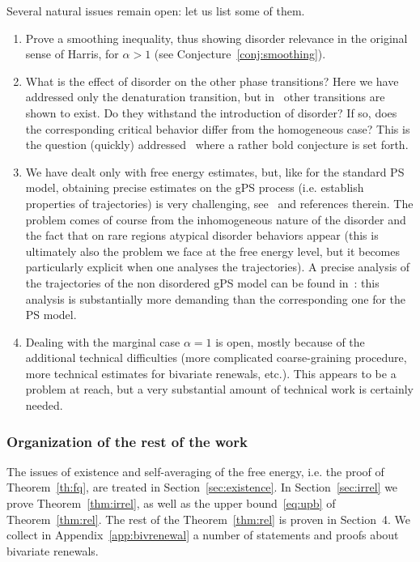 \documentclass[11pt]{article}
\theoremstyle{definition}
\numberwithin{equation}{section}
\numberwithin{figure}{section}
\numberwithin{table}{section}
\newcommand{\ga}{\alpha}
\begin{document}
Several natural issues remain open: let us list some of them.
\begin{enumerate}
\item Prove a smoothing inequality, thus showing disorder relevance in the original sense of Harris, for $\ga>1$ (see Conjecture~\ref{conj:smoothing}).
\item What is the effect of disorder on the other phase transitions? Here we have addressed only the denaturation transition, but in~\cite{cf:GK} other transitions are shown to exist. Do they withstand the introduction of disorder? If so, does the corresponding critical behavior differ from the homogeneous case? This is the question (quickly) addressed~\cite{cf:NG06} where a rather bold conjecture is set forth.
\item We have dealt only with free energy estimates, but, like for the standard PS model, obtaining precise estimates on the gPS process (i.e. establish properties of trajectories) is very challenging, see~\cite[Chapter~8]{cf:G} and references therein. The problem comes of course from the inhomogeneous nature of the disorder and the fact that on rare regions atypical disorder behaviors appear (this is ultimately also the problem we face at the free energy level, but it becomes particularly explicit when one analyses the trajectories). A precise analysis of the trajectories of the non disordered gPS model can be found in~\cite{cf:BGK}: this analysis is substantially more demanding than the corresponding one for the PS model.
\item Dealing with the marginal case $\ga=1$ is open, mostly because of the additional technical difficulties (more complicated coarse-graining procedure, more technical estimates for bivariate renewals, etc.). This appears to be a problem at reach, but a very substantial amount of technical work is certainly needed.
\end{enumerate}

\subsubsection{Organization of the rest of the work}

The issues of existence and self-averaging of the free energy, i.e. the proof of Theorem~\ref{th:fq}, are treated in Section~\ref{sec:existence}. In Section~\ref{sec:irrel} we prove Theorem~\ref{thm:irrel}, as well as the upper bound~\eqref{eq:upb} of Theorem~\ref{thm:rel}. The rest of the Theorem~\ref{thm:rel} is proven in Section~4. We collect in Appendix~\ref{app:bivrenewal} a number of statements and proofs about bivariate renewals.
\end{document}
